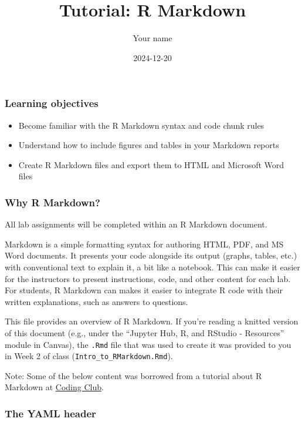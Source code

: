 \documentclass[
]{article}
\title{Tutorial: R Markdown}
\author{Your name}
\date{2024-12-20}
\providecommand{\tightlist}{%
  \setlength{\itemsep}{0pt}\setlength{\parskip}{0pt}}
\begin{document}
\maketitle

\subsubsection{\texorpdfstring{\textbf{Learning
objectives}}{Learning objectives}}\label{learning-objectives}

\begin{itemize}
\tightlist
\item
  Become familiar with the R Markdown syntax and code chunk rules\\
\item
  Understand how to include figures and tables in your Markdown
  reports\\
\item
  Create R Markdown files and export them to HTML and Microsoft Word
  files
\end{itemize}

\subsubsection{\texorpdfstring{\textbf{Why R
Markdown?}}{Why R Markdown?}}\label{why-r-markdown}

All lab assignments will be completed within an R Markdown document.

Markdown is a simple formatting syntax for authoring HTML, PDF, and MS
Word documents. It presents your code alongside its output (graphs,
tables, etc.) with conventional text to explain it, a bit like a
notebook. This can make it easier for the instructors to present
instructions, code, and other content for each lab. For students, R
Markdown can makes it easier to integrate R code with their written
explanations, such as answers to questions.

This file provides an overview of R Markdown. If you're reading a
knitted version of this document (e.g., under the ``Jupyter Hub, R, and
RStudio - Resources'' module in Canvas), the \texttt{.Rmd} file that was
used to create it was provided to you in Week 2 of class
(\texttt{Intro\_to\_RMarkdown.Rmd}).

Note: Some of the below content was borrowed from a tutorial about R
Markdown at
\href{https://ourcodingclub.github.io/tutorials/rmarkdown/}{Coding
Club}.

\subsubsection{\texorpdfstring{\textbf{The YAML
header}}{The YAML header}}\label{the-yaml-header}
\end{document}
